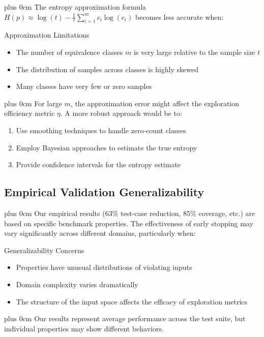 \documentclass[11pt,a4paper]{article}
\newcommand{\justifytext}{\leftskip=0pt \rightskip=0pt plus 0cm}
\begin{document}
\justifytext
The entropy approximation formula $H(p) \approx \log(t) - \frac{1}{t}\sum_{i=1}^{m}c_i\log(c_i)$ becomes less accurate when:

\begin{alertbox}{Approximation Limitations}
\begin{itemize}
\item The number of equivalence classes $m$ is very large relative to the sample size $t$
\item The distribution of samples across classes is highly skewed
\item Many classes have very few or zero samples
\end{itemize}
\end{alertbox}

\justifytext
For large $m$, the approximation error might affect the exploration efficiency metric $\eta$. A more robust approach would be to:

\begin{enumerate}
\item Use smoothing techniques to handle zero-count classes
\item Employ Bayesian approaches to estimate the true entropy
\item Provide confidence intervals for the entropy estimate
\end{enumerate}

\subsection{Empirical Validation Generalizability}

\justifytext
Our empirical results (63\% test-case reduction, 85\% coverage, etc.) are based on specific benchmark properties. The effectiveness of early stopping may vary significantly across different domains, particularly when:

\begin{alertbox}{Generalizability Concerns}
\begin{itemize}
\item Properties have unusual distributions of violating inputs
\item Domain complexity varies dramatically
\item The structure of the input space affects the efficacy of exploration metrics
\end{itemize}
\end{alertbox}

\justifytext
Our results represent average performance across the test suite, but individual properties may show different behaviors.
\end{document}
